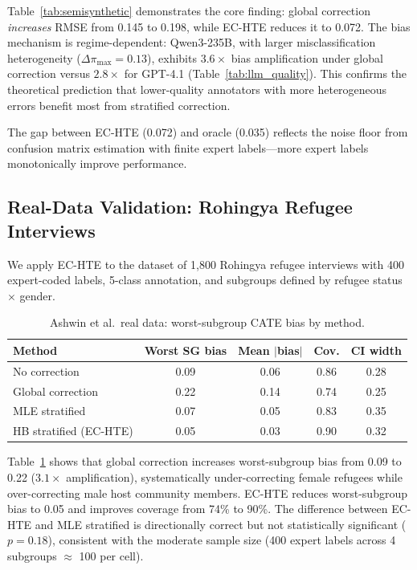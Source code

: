 \documentclass[11pt,a4paper]{article}
\begin{document}
Table~\ref{tab:semisynthetic} demonstrates the core finding: global correction \emph{increases} RMSE from 0.145 to 0.198, while EC-HTE reduces it to 0.072.
The bias mechanism is regime-dependent: Qwen3-235B, with larger misclassification heterogeneity ($\Delta\pi_{\max} = 0.13$), exhibits $3.6\times$ bias amplification under global correction versus $2.8\times$ for GPT-4.1 (Table~\ref{tab:llm_quality}).
This confirms the theoretical prediction that lower-quality annotators with more heterogeneous errors benefit most from stratified correction.

The gap between EC-HTE (0.072) and oracle (0.035) reflects the noise floor from confusion matrix estimation with finite expert labels---more expert labels monotonically improve performance.

\subsection{Real-Data Validation: Rohingya Refugee Interviews}
\label{sec:real}

We apply EC-HTE to the \citet{ashwin2025using} dataset of 1{,}800 Rohingya refugee interviews with 400 expert-coded labels, 5-class annotation, and subgroups defined by refugee status $\times$ gender.

\begin{table}[t]
\centering
\small
\caption{Ashwin et al.\ real data: worst-subgroup CATE bias by method.}
\label{tab:real}
\begin{tabular}{lcccc}
\toprule
Method & Worst SG bias & Mean $|$bias$|$ & Cov. & CI width \\
\midrule
No correction & 0.09 & 0.06 & 0.86 & 0.28 \\
Global correction & 0.22 & 0.14 & 0.74 & 0.25 \\
MLE stratified & 0.07 & 0.05 & 0.83 & 0.35 \\
HB stratified (EC-HTE) & 0.05 & 0.03 & 0.90 & 0.32 \\
\bottomrule
\end{tabular}
\end{table}

Table~\ref{tab:real} shows that global correction increases worst-subgroup bias from 0.09 to 0.22 ($3.1\times$ amplification), systematically under-correcting female refugees while over-correcting male host community members.
EC-HTE reduces worst-subgroup bias to 0.05 and improves coverage from 74\% to 90\%.
The difference between EC-HTE and MLE stratified is directionally correct but not statistically significant ($p = 0.18$), consistent with the moderate sample size (400 expert labels across 4 subgroups $\approx$ 100 per cell).
\end{document}
